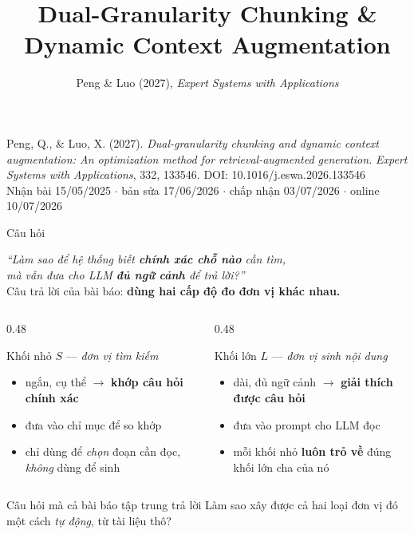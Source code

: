 \documentclass[aspectratio=169,10pt]{beamer}
\title[Dual-Granularity Chunking cho RAG]{Dual-Granularity Chunking \& Dynamic Context Augmentation}
\subtitle[Đọc bài báo gốc và liên hệ với pipeline báo cáo ETF]{Peng \& Luo (2027), \emph{Expert Systems with Applications}}
\author{}
\date{}
\begin{document}
\begin{frame}
  \titlepage
  \vspace{-1.4em}
  {\footnotesize
  Peng, Q., \& Luo, X. (2027).\quad
  \emph{Dual-granularity chunking and dynamic context augmentation: An optimization
  method for retrieval-augmented generation.}\quad
  \emph{Expert Systems with Applications}, 332, 133546.\quad
  DOI: 10.1016/j.eswa.2026.133546\\
  Nhận bài 15/05/2025 $\cdot$ bản sửa 17/06/2026 $\cdot$ chấp nhận 03/07/2026 $\cdot$ online 10/07/2026}
\end{frame}

\begin{frame}{Câu hỏi}
  \begin{center}
  {\large\itshape ``Làm sao để hệ thống biết \textbf{chính xác chỗ nào} cần tìm,\\
  mà vẫn đưa cho LLM \textbf{đủ ngữ cảnh} để trả lời?''}\\[0.6em]
  {\normalsize Câu trả lời của bài báo: \textbf{dùng hai cấp độ đo đơn vị khác nhau.}}
  \end{center}
  \vspace{0.3em}
  \begin{columns}[T]
    \begin{column}{0.48\textwidth}
      \begin{block}{\small Khối nhỏ $S$ --- \emph{đơn vị tìm kiếm}}
        \begin{itemize}\footnotesize
          \item ngắn, cụ thể $\rightarrow$ \textbf{khớp câu hỏi chính xác}
          \item đưa vào chỉ mục để so khớp
          \item chỉ dùng để \emph{chọn} đoạn cần đọc, \emph{không} dùng để sinh
        \end{itemize}
      \end{block}
    \end{column}
    \begin{column}{0.48\textwidth}
      \begin{block}{\small Khối lớn $L$ --- \emph{đơn vị sinh nội dung}}
        \begin{itemize}\footnotesize
          \item dài, đủ ngữ cảnh $\rightarrow$ \textbf{giải thích được câu hỏi}
          \item đưa vào prompt cho LLM đọc
          \item mỗi khối nhỏ \textbf{luôn trỏ về} đúng khối lớn cha của nó
        \end{itemize}
      \end{block}
    \end{column}
  \end{columns}
  \begin{alertblock}{\small Câu hỏi mà cả bài báo tập trung trả lời}
    Làm sao xây được cả hai loại đơn vị đó một cách \emph{tự động}, từ tài liệu thô?
  \end{alertblock}
\end{frame}
\end{document}
